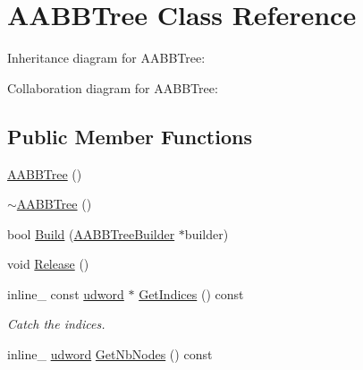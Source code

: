 \hypertarget{class_a_a_b_b_tree}{\section{A\+A\+B\+B\+Tree Class Reference}
\label{class_a_a_b_b_tree}
}


Inheritance diagram for A\+A\+B\+B\+Tree\+:


Collaboration diagram for A\+A\+B\+B\+Tree\+:
\subsection*{Public Member Functions}
\begin{DoxyCompactItemize}
\item 
\hyperlink{class_a_a_b_b_tree_ad5b760ccbc90b5cfa5ba2b08231a00e4}{A\+A\+B\+B\+Tree} ()
\item 
\hyperlink{class_a_a_b_b_tree_a093aa9a3837c574f8779f36ce882332a}{$\sim$\+A\+A\+B\+B\+Tree} ()
\item 
bool \hyperlink{class_a_a_b_b_tree_a4cc7addadfb139b13288d09b7fe5f3ad}{Build} (\hyperlink{class_a_a_b_b_tree_builder}{A\+A\+B\+B\+Tree\+Builder} $\ast$builder)
\item 
void \hyperlink{class_a_a_b_b_tree_a5afb9bb2637b341242003ba2df1378f9}{Release} ()
\item 
\hypertarget{class_a_a_b_b_tree_a71f0c0c2593f20c034dd5a90534c082c}{inline\+\_\+ const \hyperlink{_ice_types_8h_a44c6f1920ba5551225fb534f9d1a1733}{udword} $\ast$ \hyperlink{class_a_a_b_b_tree_a71f0c0c2593f20c034dd5a90534c082c}{Get\+Indices} () const }\label{class_a_a_b_b_tree_a71f0c0c2593f20c034dd5a90534c082c}

\begin{DoxyCompactList}\small\item\em Catch the indices. \end{DoxyCompactList}\item 
\hypertarget{class_a_a_b_b_tree_a1726969e74677384364703bb246addb8}{inline\+\_\+ \hyperlink{_ice_types_8h_a44c6f1920ba5551225fb534f9d1a1733}{udword} \hyperlink{class_a_a_b_b_tree_a1726969e74677384364703bb246addb8}{Get\+Nb\+Nodes} () const }\label{class_a_a_b_b_tree_a1726969e74677384364703bb246addb8}


\end{DoxyCompactItemize}
